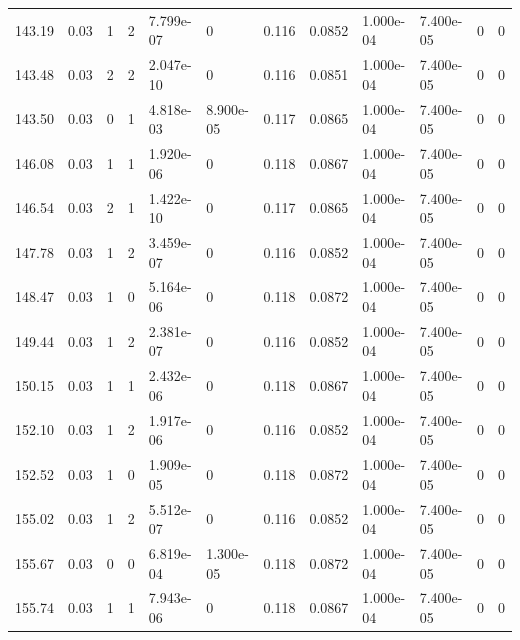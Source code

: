 \documentclass[preview]{standalone}
\begin{document}
{{{{\begin{tabular}{L{1.2cm}C{1.2cm} C{0.3cm}C{0.5cm} C{1.4cm}C{1.4cm} C{1.4cm}C{1.4cm} C{1.6cm}C{1.6cm} C{1.6cm}C{1.6cm}}
  143.19  &  0.03  & 1     &  2 &  7.799e-07  & 0  &  0.116&   0.0852& 1.000e-04 & 7.400e-05   &  0 & 0  \\ 
  143.48  &  0.03  & 2     &  2 &  2.047e-10  & 0  &  0.116&   0.0851& 1.000e-04 & 7.400e-05   &  0 & 0  \\ 
  143.50  &  0.03  & 0     &  1 &  4.818e-03  & 8.900e-05  &  0.117&   0.0865& 1.000e-04 & 7.400e-05   &  0 & 0  \\ 
  146.08  &  0.03  & 1     &  1 &  1.920e-06  & 0  &  0.118&   0.0867& 1.000e-04 & 7.400e-05   &  0 & 0  \\ 
  146.54  &  0.03  & 2     &  1 &  1.422e-10  & 0  &  0.117&   0.0865& 1.000e-04 & 7.400e-05   &  0 & 0  \\ 
  147.78  &  0.03  & 1     &  2 &  3.459e-07  & 0  &  0.116&   0.0852& 1.000e-04 & 7.400e-05   &  0 & 0  \\ 
  148.47  &  0.03  & 1     &  0 &  5.164e-06  & 0  &  0.118&   0.0872& 1.000e-04 & 7.400e-05   &  0 & 0  \\ 
  149.44  &  0.03  & 1     &  2 &  2.381e-07  & 0  &  0.116&   0.0852& 1.000e-04 & 7.400e-05   &  0 & 0  \\ 
  150.15  &  0.03  & 1     &  1 &  2.432e-06  & 0  &  0.118&   0.0867& 1.000e-04 & 7.400e-05   &  0 & 0  \\ 
  152.10  &  0.03  & 1     &  2 &  1.917e-06  & 0  &  0.116&   0.0852& 1.000e-04 & 7.400e-05   &  0 & 0  \\ 
  152.52  &  0.03  & 1     &  0 &  1.909e-05  & 0  &  0.118&   0.0872& 1.000e-04 & 7.400e-05   &  0 & 0  \\ 
  155.02  &  0.03  & 1     &  2 &  5.512e-07  & 0  &  0.116&   0.0852& 1.000e-04 & 7.400e-05   &  0 & 0  \\ 
  155.67  &  0.03  & 0     &  0 &  6.819e-04  & 1.300e-05  &  0.118&   0.0872& 1.000e-04 & 7.400e-05   &  0 & 0  \\ 
  155.74  &  0.03  & 1     &  1 &  7.943e-06  & 0  &  0.118&   0.0867& 1.000e-04 & 7.400e-05   &  0 & 0  \\ 
\hline 
\end{tabular} 

}}}}
\end{document}
